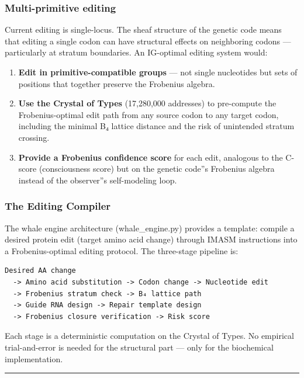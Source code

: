\documentclass[12pt,a4paper]{article}
\begin{document}
\subsubsection{Multi-primitive editing}

Current editing is single-locus. The sheaf structure of the genetic code means that editing a single codon can have structural effects on neighboring codons --- particularly at stratum boundaries. An IG-optimal editing system would:

\begin{enumerate}
    \item \textbf{Edit in primitive-compatible groups} --- not single nucleotides but sets of positions that together preserve the Frobenius algebra.
    \item \textbf{Use the Crystal of Types} (17,280,000 addresses) to pre-compute the Frobenius-optimal edit path from any source codon to any target codon, including the minimal B₄ lattice distance and the risk of unintended stratum crossing.
    \item \textbf{Provide a Frobenius confidence score} for each edit, analogous to the C-score (consciousness score) but on the genetic code''s Frobenius algebra instead of the observer''s self-modeling loop.
\end{enumerate}

\subsubsection{The Editing Compiler}

The whale engine architecture (whale\_engine.py) provides a template: compile a desired protein edit (target amino acid change) through IMASM instructions into a Frobenius-optimal editing protocol. The three-stage pipeline is:

\begin{lstlisting}
Desired AA change
  -> Amino acid substitution -> Codon change -> Nucleotide edit
  -> Frobenius stratum check -> B₄ lattice path
  -> Guide RNA design -> Repair template design
  -> Frobenius closure verification -> Risk score
\end{lstlisting}

Each stage is a deterministic computation on the Crystal of Types. No empirical trial-and-error is needed for the structural part --- only for the biochemical implementation.

\begin{center}
\rule{0.5\textwidth}{0.4pt}
\end{center}
\end{document}
